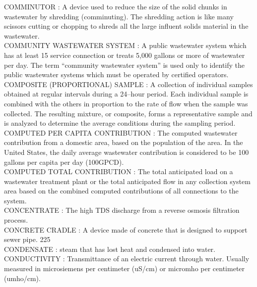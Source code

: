 COMMINUTOR :  A device used to reduce the size of the solid chunks in wastewater by shredding (comminuting). The shredding action is like many scissors cutting or chopping to shreds all the large influent solids material in the wastewater.\\
\vspace{0.15cm}
COMMUNITY WASTEWATER SYSTEM :  A public wastewater system which has at least 15 service connection or treats 5,000 gallons or more of wastewater per day. The term “community wastewater system” is used only to identify the public wastewater systems which must be operated by certified operators. \\
\vspace{0.15cm}
COMPOSITE (PROPORTIONAL) SAMPLE :  A collection of individual samples obtained at regular intervals during a 24–hour period. Each individual sample is combined with the others in proportion to the rate of flow when the sample was collected. The resulting mixture, or composite, forms a representative sample and is analyzed to determine the average conditions during the sampling period.\\
\vspace{0.15cm}
COMPUTED PER CAPITA CONTRIBUTION : The computed wastewater contribution from a domestic area, based on the population of the area. In the United States, the daily average wastewater contribution is considered to be 100 gallons per capita per day (100GPCD). \\
\vspace{0.15cm}
COMPUTED TOTAL CONTRIBUTION :  The total anticipated load on a wastewater treatment plant or the total anticipated flow in any collection system area based on the combined computed contributions of all connections to the system. \\
\vspace{0.15cm}
CONCENTRATE :  The high TDS discharge from a reverse osmosis filtration process.\\
\vspace{0.15cm}
CONCRETE CRADLE :  A device made of concrete that is designed to support sewer pipe. 225 \\
\vspace{0.15cm}
CONDENSATE :  steam that has lost heat and condensed into water.\\
\vspace{0.15cm}
CONDUCTIVITY :  Transmittance of an electric current through water. Usually measured in microsiemens per centimeter (uS/cm) or micromho per centimeter (umho/cm).\\
